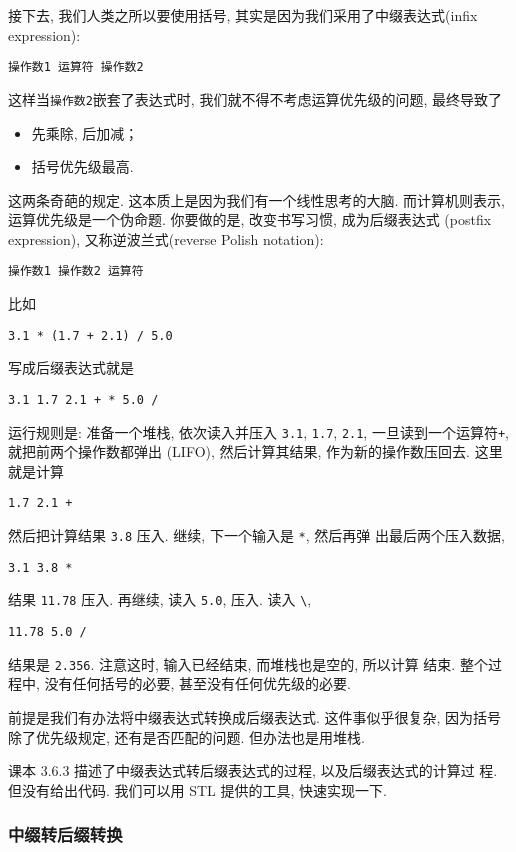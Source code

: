\documentclass[a4paper]{ctexart}
\theoremstyle{definition}
\theoremstyle{definition}
\begin{document}
接下去, 我们人类之所以要使用括号, 其实是因为我们采用了中缀表达式(inﬁx
expression):
\begin{verbatim}
操作数1 运算符 操作数2 
\end{verbatim}
这样当\verb|操作数2|嵌套了表达式时, 我们就不得不考虑运算优先级的问题,
最终导致了
\begin{itemize}
\item 先乘除, 后加减；
\item 括号优先级最高.
\end{itemize}
这两条奇葩的规定. 这本质上是因为我们有一个线性思考的大脑. 而计算机则表示, 
运算优先级是一个伪命题. 你要做的是, 改变书写习惯, 成为后缀表达式
(postﬁx expression), 又称逆波兰式(reverse Polish notation):
\begin{verbatim}
操作数1 操作数2 运算符  
\end{verbatim}
比如
\begin{verbatim}
3.1 * (1.7 + 2.1) / 5.0
\end{verbatim}
写成后缀表达式就是
\begin{verbatim}
3.1 1.7 2.1 + * 5.0 /
\end{verbatim}
运行规则是: 准备一个堆栈, 依次读入并压入 \verb|3.1|, \verb|1.7|,
\verb|2.1|, 一旦读到一个运算符\verb|+|, 就把前两个操作数都弹出
(LIFO), 然后计算其结果, 作为新的操作数压回去. 这里就是计算
\begin{verbatim}
1.7 2.1 +
\end{verbatim}
然后把计算结果 \verb|3.8| 压入. 继续, 下一个输入是 \verb|*|, 然后再弹
出最后两个压入数据,
\begin{verbatim}
3.1 3.8 *
\end{verbatim}
结果 \verb|11.78| 压入. 再继续, 读入 \verb|5.0|, 压入. 读入 \verb|\|,
\begin{verbatim}
11.78 5.0 /
\end{verbatim}
结果是 \verb|2.356|. 注意这时, 输入已经结束, 而堆栈也是空的, 所以计算
结束. 整个过程中, 没有任何括号的必要, 甚至没有任何优先级的必要.

前提是我们有办法将中缀表达式转换成后缀表达式. 这件事似乎很复杂, 
因为括号除了优先级规定, 还有是否匹配的问题. 但办法也是用堆栈.

课本 3.6.3 描述了中缀表达式转后缀表达式的过程, 以及后缀表达式的计算过
程. 但没有给出代码. 我们可以用 STL 提供的工具, 快速实现一下.

\subsubsection*{中缀转后缀转换}
\end{document}
